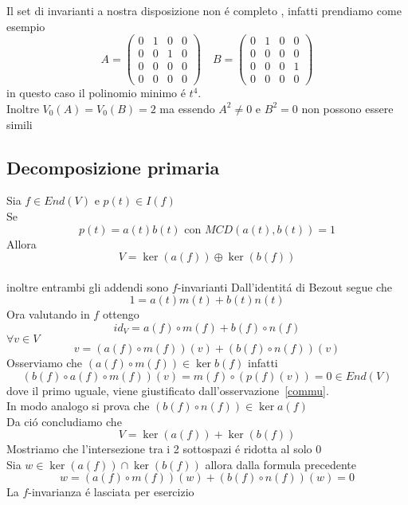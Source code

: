 \begin{oss} Il set di invarianti a nostra disposizione non \'e completo , infatti prendiamo come esempio
$$ A= \begin{pmatrix}
0 & 1 & 0 & 0 \\ 
0 & 0 & 1 & 0 \\ 
0 & 0 & 0 & 0 \\ 
0 & 0 & 0 & 0
\end{pmatrix}   \quad B= \begin{pmatrix}
0 & 1 & 0 & 0 \\ 
0 & 0 & 0 & 0 \\ 
0 & 0 & 0 & 1 \\ 
0 & 0 & 0 & 0
\end{pmatrix} $$ 
in 	questo caso il polinomio minimo \'e $t^4$.\\
Inoltre $V_0(A) =V_0(B)=2$ ma essendo $A^2 \neq 0 $ e $B^2 =0 $ non possono essere simili
\end{oss}
\spazio

\newpage
\subsection{Decomposizione primaria}
\begin{thm}\bianco
Sia $ f \in End(V) $ e $ p(t) \in I(f) $\\
Se $$ p(t)=a(t) b(t) \text{ con } MCD(a(t), b(t))=1 $$
Allora $$V =\ker (a(f)) \oplus \ker (b(f))$$\\
inoltre entrambi gli addendi sono $f$-invarianti 
\proof Dall'identit\'a di Bezout segue che 
$$ 1=a(t) m(t) + b(t)n(t) $$ 
Ora valutando in $f$ ottengo
$$ id_V=a(f)\circ m(f)+ b(f) \circ n(f)$$
$\forall v \in V $ 
$$ v=(a(f)\circ m(f))(v)+ (b(f)\circ n(f))(v)$$ 
Osserviamo che $(a(f)\circ m(f)) \in \ker b(f) $ infatti
$$ (b(f) \circ a(f) \circ m(f)) (v)= m(f) \circ (p(f) (v)) =0 \in End(V) $$
dove il primo uguale, viene giustificato dall'osservazione~\ref{commu}.\\
In modo analogo si prova che $(b(f)\circ n(f)) \in  \ker a(f) $\\
Da ci\'o concludiamo che $$V =\ker (a(f)) + \ker (b(f))$$
Mostriamo che l'intersezione tra i 2 sottospazi \'e ridotta al solo $0$ \\
Sia $ w \in \ker (a(f)) \cap \ker (b(f))$ allora dalla formula precedente 
$$  w=(a(f)\circ m(f))(w)+ (b(f)\circ n(f))(w)=0$$ 
La $f$-invarianza \'e lasciata per esercizio
\endproof
\end{thm}


